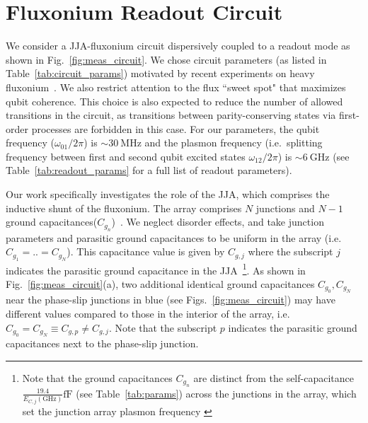 \documentclass[%
reprint,
superscriptaddress,
 amsmath,amssymb,
 aps,
 prx,
longbibliography,
floatfix,
]{revtex4-2}
\begin{document}

\section{Fluxonium Readout Circuit}\label{sec:Fluxonium}


We consider a JJA-fluxonium circuit dispersively coupled to a readout mode as shown in Fig.~\ref{fig:meas_circuit}. We chose circuit parameters (as listed in Table~\ref{tab:circuit_params}) motivated by recent experiments on heavy fluxonium~\cite{zhang_tunable_2024,zhang_universal_2021, ding_high-fidelity_2023}.  We also restrict attention to the flux ``sweet spot" that maximizes qubit coherence.
This choice is also expected to reduce the number of allowed transitions in the circuit, as transitions between parity-conserving states via first-order processes are forbidden in this case. For our parameters, the qubit frequency ($\omega_{01}/2\pi$) is $\sim 30 \ \mathrm{MHz}$ and the plasmon frequency (i.e.~splitting frequency between first and second qubit excited states $\omega_{12}/2\pi$) is $\sim 6 \ \mathrm{GHz}$ (see Table~\ref{tab:readout_params} for a full list of readout parameters).
 

Our work specifically investigates the role of the JJA, which comprises the inductive shunt of the fluxonium. The array comprises $N$ junctions and $N-1$ ground capacitances($C_{g_n}$)~\cite{manucharyan2009fluxonium}. We neglect disorder effects, and take junction parameters and parasitic ground capacitances to be uniform in the array (i.e.~$C_{g_1}=..=C_{g_{N}}$). This capacitance value is given by $C_{g,j}$ where the subscript $j$ indicates the parasitic ground capacitance in the JJA~\footnote{Note that the ground capacitances $C_{g_n}$ are distinct from the self-capacitance $\frac{19.4}{E_{C,j}(\mathrm{GHz})}\mathrm{fF}$ (see Table~\ref{tab:params}) across the junctions in the array, which set the junction array plasmon frequency \cite{catelani2011relaxation}}. As shown in Fig.~\ref{fig:meas_circuit}(a), 
two additional identical ground capacitances $C_{g_0}, C_{g_N}$ near the phase-slip junctions in blue (see Figs.~\ref{fig:meas_circuit}) may have different values compared to those in the interior of the array, i.e.~
$C_{g_0}=C_{g_N}\equiv C_{g,p}\neq C_{g, j}$. Note that the subscript $p$ indicates the parasitic ground capacitances next to the phase-slip junction.
\end{document}
